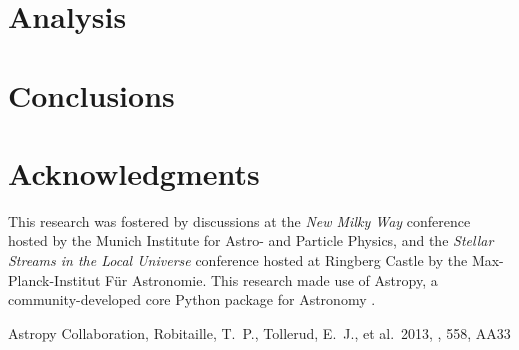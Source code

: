 \documentclass[useAMS,usenatbib]{mn2e}
\begin{document}


\section{Analysis}



\section{Conclusions}


\section*{Acknowledgments}
This research was fostered by discussions at the \textit{New Milky Way}
conference hosted by the Munich Institute for Astro- and Particle Physics, and
the \textit{Stellar Streams in the Local Universe} conference hosted at Ringberg
Castle by the Max-Planck-Institut F\"ur Astronomie. This research made use of 
Astropy, a community-developed core Python package for Astronomy \citep{astropy}.

\begin{thebibliography}{99}
 Astropy Collaboration, Robitaille, T.~P., Tollerud, E.~J., et al.\ 2013, \aap, 558, AA33
\end{thebibliography}


\label{lastpage}
\end{document}

